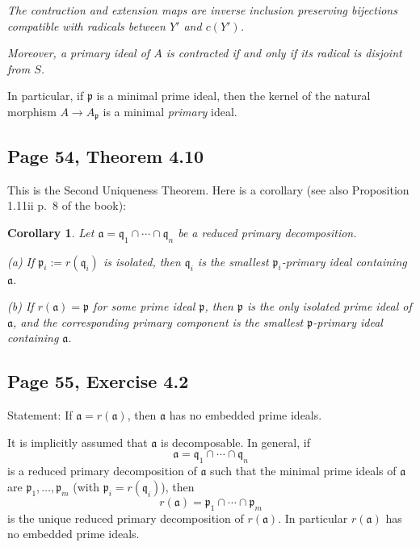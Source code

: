 \documentclass[parskip=half,fontsize=12pt]{scrartcl}%
\newcommand{\mf}{\mathfrak}
\newcommand{\aaa}{\mf a}
\newcommand{\ppp}{\mf p}
\newcommand{\qqq}{\mf q}
\newtheorem{cor}[thm]{Corollary}
\begin{document}
\emph{The contraction and extension maps are inverse inclusion preserving bijections compatible with radicals between $Y'$ and $c(Y')$.} 

\emph{Moreover, a primary ideal of $A$ is contracted if and only if its radical is disjoint from $S$.}

In particular, if $\ppp$ is a minimal prime ideal, then the kernel of the natural morphism $A\to A_\ppp$ is a minimal \emph{primary} ideal.

%
\begin{comment}
We have 
$$
\mf q^{\text{ec}}=\bigcup_{s\in S}\ (\mf q:s)=\mf q
$$ 
by Proposition 3.11ii p.~41 and Lemma 4.4iii p.~51, and 
$$
r(\mf q^{\text e})=r(S^{-1}\mf q)=S^{-1}r(\mf q)=S^{-1}\ppp
$$ 
by Proposition 3.11v p.~42.
\end{comment}
%

\subsection{Page 54, Theorem 4.10}%

This is the Second Uniqueness Theorem. Here is a corollary (see also Proposition 1.11ii p.~8 of the book):

\begin{cor}\label{410}
Let $\aaa=\qqq_1\cap\cdots\cap\qqq_n$ be a reduced primary decomposition.

(a) If $\ppp_i:=r(\qqq_i)$ is isolated, then $\qqq_i$ is the smallest $\ppp_i$-primary ideal containing $\aaa$.%

(b) If $r(\aaa)=\ppp$ for some prime ideal $\ppp$, then $\ppp$ is the only isolated prime ideal of $\aaa$, and the corresponding primary component is the smallest $\ppp$-primary ideal containing $\aaa$.
\end{cor}

\subsection{Page 55, Exercise 4.2}%

Statement: If $\aaa=r(\aaa)$, then $\aaa$ has no embedded prime ideals.

It is implicitly assumed that $\aaa$ is decomposable. In general, if 
$$
\aaa=\qqq_1\cap\cdots\cap\qqq_n
$$ 
is a reduced primary decomposition of $\aaa$ such that the minimal prime ideals of $\aaa$ are $\ppp_1,\dots,\ppp_m$ (with $\ppp_i=r(\qqq_i)$), then 
$$
r(\aaa)=\ppp_1\cap\cdots\cap\ppp_m
$$ 
is the unique reduced primary decomposition of $r(\aaa)$. In particular $r(\aaa)$ has no embedded prime ideals. 
\end{document}
